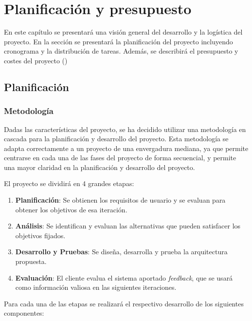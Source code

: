 \chapter{Planificación y presupuesto}\label{chap:planificacion}
En este capítulo se presentará una visión general del desarrollo y la logística del proyecto. En la sección  se presentará la planificación del proyecto incluyendo cronograma y la distribución de tareas. Además, se describirá el presupuesto y costes del proyecto () 

\section{Planificación}\label{sec:planificacion}

\subsection{Metodología}\label{sec:metodologia}
Dadas las características del proyecto, se ha decidido utilizar una metodología en cascada \cite{ModeloCascada} para la planificación y desarrollo del proyecto. Esta metodología se adapta correctamente a un proyecto de una envergadura mediana, ya que permite centrarse en cada una de las fases del proyecto de forma secuencial, y permite una mayor claridad en la planificación y desarrollo del proyecto.

El proyecto se dividirá en 4 grandes etapas: 

\begin{enumerate}
    \item \textbf{Planificación}: Se obtienen los requisitos de usuario y se evaluan para obtener los objetivos de esa iteración.
    \item \textbf{Análisis}: Se identifican y evaluan las alternativas que pueden satisfacer los objetivos fijados.
    \item \textbf{Desarrollo y Pruebas}: Se diseña, desarrolla y prueba la arquitectura propuesta.
    \item \textbf{Evaluación}: El cliente evalua el sistema aportado \textit{feedback}, que se usará como información valiosa en las siguientes iteraciones.
\end{enumerate}

Para cada una de las etapas se realizará el respectivo desarrollo de los siguientes componentes:

